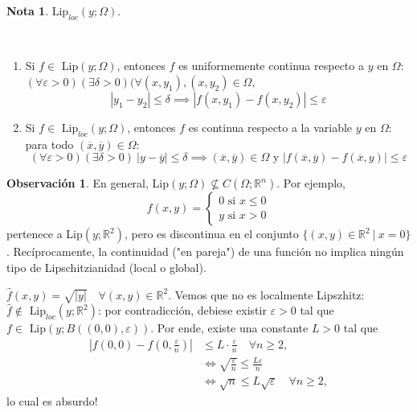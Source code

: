 \documentclass[11pt]{article}
\theoremstyle{definition} %
\newtheorem{remark}[theorem]{Observación}
\newtheorem{note}[theorem]{Nota}
\newcommand{\R}{\mathbb{R}}
\begin{document}
\begin{note}
	$\text{Lip}_{\textit{loc}}(y;\Omega)$.
\end{note}

\begin{prop}~
	\begin{enumerate}
		\item Si $f \in \text{ Lip}(y;\Omega)$, entonces $f$ es uniformemente continua respecto a $y$ en $\Omega$: $(\forall \varepsilon > 0)(\exists \delta > 0)(\forall (x,y_1),(x,y_2) \in \Omega,$
		\[ |y_1-y_2|\leq\delta \implies |f(x,y_1)-f(x,y_2)| \leq \varepsilon \]

		\item Si $f\in \text{ Lip}_{\textit{loc}}(y;\Omega)$, entonces $f$ es continua respecto a la variable $y$ en $\Omega$: para todo $(\overline{x},\overline{y})\in\Omega$:
		\[ (\forall \varepsilon > 0)(\exists \delta > 0)\ |y-\overline{y}|\leq \delta \implies (\overline{x},\overline{y})\in\Omega \text{ y } |f(\overline{x},\overline{y}) - f(\overline{x},y)| \leq \varepsilon \]
	\end{enumerate}
\end{prop}

\begin{remark}
	En general, Lip$(y;\Omega) \not\subseteq C(\Omega;\R^n)$. Por ejemplo,
	\[ f(x,y) = \begin{cases}
		0 \text{ si } x \leq 0 \\
		y \text{ si } x > 0
	\end{cases} \]
	pertenece a Lip$(y;\R^2)$, pero es discontinua en el conjunto $\{ (x,y) \in \R^2 \ | \ x = 0 \}$. Recíprocamente, la continuidad ("en pareja") de una función no implica ningún tipo de Lipschitzianidad (local o global).
\end{remark}

\begin{eg}
	$\hat{f}(x,y) = \sqrt{|y|}\quad \forall (x,y) \in \R^2$. Vemos que no es localmente Lipszhitz: $\hat{f} \not\in \text{ Lip}_{\textit{loc}}(y;\R^2)$: por contradicción, debiese existir $\varepsilon > 0$ tal que $f \in \text{ Lip}(y; B((0,0),\varepsilon))$. Por ende, existe una constante $L>0$ tal que
	\begin{align*}
		\left|f(0,0)-f \left(0,\frac{\varepsilon}{n}\right)\right| & \leq L \cdot \frac{\varepsilon}{n} \quad \forall n \geq 2, \\
		& \iff \sqrt{\frac{\varepsilon}{n}} \leq \frac{L \varepsilon}{n} \\
		& \iff \sqrt{n} \leq L \sqrt{\varepsilon} \quad \forall n \geq 2,
	\end{align*}
	\noindent lo cual es absurdo!
\end{eg}
\end{document}
